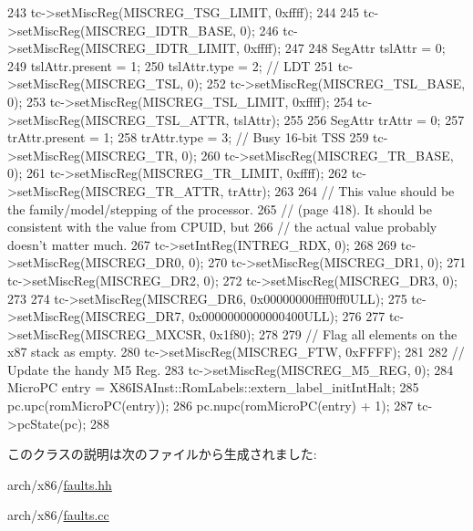 \begin{DoxyCode}
{243         tc->setMiscReg(MISCREG_TSG_LIMIT, 0xffff);
244 
245         tc->setMiscReg(MISCREG_IDTR_BASE, 0);
246         tc->setMiscReg(MISCREG_IDTR_LIMIT, 0xffff);
247 
248         SegAttr tslAttr = 0;
249         tslAttr.present = 1;
250         tslAttr.type = 2; // LDT
251         tc->setMiscReg(MISCREG_TSL, 0);
252         tc->setMiscReg(MISCREG_TSL_BASE, 0);
253         tc->setMiscReg(MISCREG_TSL_LIMIT, 0xffff);
254         tc->setMiscReg(MISCREG_TSL_ATTR, tslAttr);
255 
256         SegAttr trAttr = 0;
257         trAttr.present = 1;
258         trAttr.type = 3; // Busy 16-bit TSS
259         tc->setMiscReg(MISCREG_TR, 0);
260         tc->setMiscReg(MISCREG_TR_BASE, 0);
261         tc->setMiscReg(MISCREG_TR_LIMIT, 0xffff);
262         tc->setMiscReg(MISCREG_TR_ATTR, trAttr);
263 
264         // This value should be the family/model/stepping of the processor.
265         // (page 418). It should be consistent with the value from CPUID, but
266         // the actual value probably doesn't matter much.
267         tc->setIntReg(INTREG_RDX, 0);
268 
269         tc->setMiscReg(MISCREG_DR0, 0);
270         tc->setMiscReg(MISCREG_DR1, 0);
271         tc->setMiscReg(MISCREG_DR2, 0);
272         tc->setMiscReg(MISCREG_DR3, 0);
273 
274         tc->setMiscReg(MISCREG_DR6, 0x00000000ffff0ff0ULL);
275         tc->setMiscReg(MISCREG_DR7, 0x0000000000000400ULL);
276 
277         tc->setMiscReg(MISCREG_MXCSR, 0x1f80);
278 
279         // Flag all elements on the x87 stack as empty.
280         tc->setMiscReg(MISCREG_FTW, 0xFFFF);
281 
282         // Update the handy M5 Reg.
283         tc->setMiscReg(MISCREG_M5_REG, 0);
284         MicroPC entry = X86ISAInst::RomLabels::extern_label_initIntHalt;
285         pc.upc(romMicroPC(entry));
286         pc.nupc(romMicroPC(entry) + 1);
287         tc->pcState(pc);
288     }
\end{DoxyCode}


このクラスの説明は次のファイルから生成されました:\begin{DoxyCompactItemize}
\item 
arch/x86/\hyperlink{arch_2x86_2faults_8hh}{faults.hh}\item 
arch/x86/\hyperlink{arch_2x86_2faults_8cc}{faults.cc}\end{DoxyCompactItemize}
